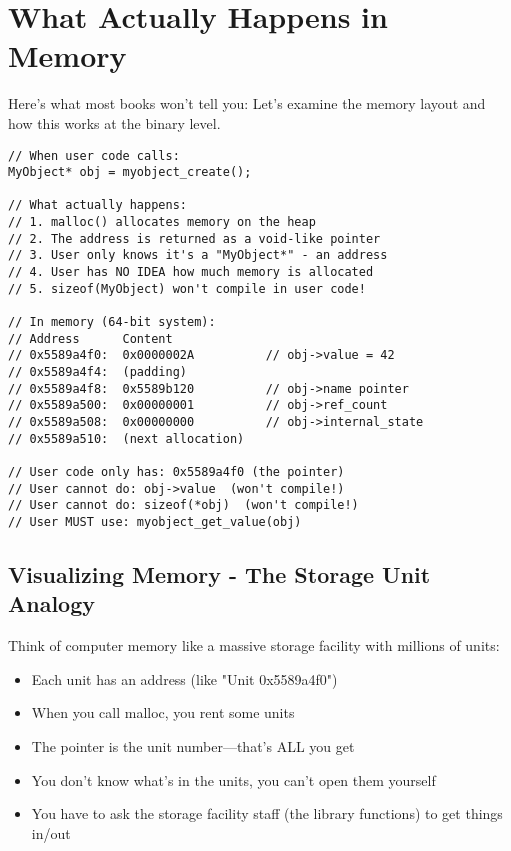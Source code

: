 \section{What Actually Happens in Memory}

Here's what most books won't tell you: Let's examine the memory layout and how this works at the binary level.

\begin{lstlisting}
// When user code calls:
MyObject* obj = myobject_create();

// What actually happens:
// 1. malloc() allocates memory on the heap
// 2. The address is returned as a void-like pointer
// 3. User only knows it's a "MyObject*" - an address
// 4. User has NO IDEA how much memory is allocated
// 5. sizeof(MyObject) won't compile in user code!

// In memory (64-bit system):
// Address      Content
// 0x5589a4f0:  0x0000002A          // obj->value = 42
// 0x5589a4f4:  (padding)
// 0x5589a4f8:  0x5589b120          // obj->name pointer
// 0x5589a500:  0x00000001          // obj->ref_count
// 0x5589a508:  0x00000000          // obj->internal_state
// 0x5589a510:  (next allocation)

// User code only has: 0x5589a4f0 (the pointer)
// User cannot do: obj->value  (won't compile!)
// User cannot do: sizeof(*obj)  (won't compile!)
// User MUST use: myobject_get_value(obj)
\end{lstlisting}

\subsection*{Visualizing Memory - The Storage Unit Analogy}

Think of computer memory like a massive storage facility with millions of units:

\begin{itemize}
    \item Each unit has an address (like "Unit 0x5589a4f0")
    \item When you call malloc, you rent some units
    \item The pointer is the unit number---that's ALL you get
    \item You don't know what's in the units, you can't open them yourself
    \item You have to ask the storage facility staff (the library functions) to get things in/out
\end{itemize}


